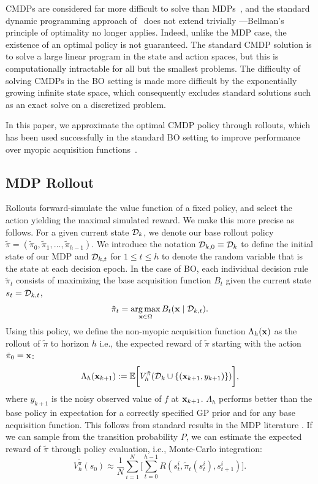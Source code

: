 CMDPs are considered far more difficult to solve than MDPs~\citep{altman1999constrained}, and the standard dynamic programming approach of~\citet{bertsekas1995dynamic} does not extend trivially ---Bellman's principle of optimality no longer applies.
Indeed, unlike the MDP case, the existence of an optimal policy is not guaranteed.
The standard CMDP solution is to solve a large linear program in the state and action spaces, but this is computationally intractable for all but the smallest problems.
The difficulty of solving CMDPs in the BO setting is made more difficult by the exponentially growing infinite state space, which consequently excludes standard solutions such as an exact solve on a discretized problem.

In this paper, we approximate the optimal CMDP policy through rollouts, which has been used successfully in the standard BO setting to improve performance over myopic acquisition functions~\citep{lam2016bayesian}.

\subsection{MDP Rollout}
Rollouts forward-simulate the value function of a fixed policy, and select the action yielding the maximal simulated reward.
We make this more precise as follows.
For a given current state ${\mathcal{D}}_k$, we denote our base rollout policy $\tilde \pi = (\tilde \pi_0, \tilde \pi_1, \ldots ,\tilde \pi_{h-1})$.
We introduce the notation ${\mathcal{D}}_{k,0}\equiv{\mathcal{D}}_k$ to define the initial state of our MDP and ${\mathcal{D}}_{k,t}$ for $1\leq t\leq h$ to denote the random variable that is the state at each decision epoch.
In the case of BO, each individual decision rule $\tilde{\pi}_t$ consists of maximizing the base acquisition function $B_t$ given the current state $s_t={\mathcal{D}}_{k,t}$,
\[
    \tilde \pi_t = \operatorname*{arg\,max}_{{\mathbf{x}} \in \Omega} B_t({\mathbf{x}} \mid {\mathcal{D}}_{k,t}).
\]
Using this policy, we define the non-myopic acquisition function $\Lambda_h({\mathbf{x}})$ as the rollout of $\tilde \pi$ to horizon $h$ i.e., the expected reward of $\tilde{\pi}$ starting with the action $\tilde{\pi}_0={\mathbf{x}}$:
\[
    \Lambda_{h}({\mathbf{x}}_{k+1}) := {\mathbb E} \bigg[ V^{\tilde \pi}_h ({\mathcal{D}}_k \cup \{({\mathbf{x}}_{k+1}, y_{k+1})\}) \bigg] ,
\]
where $y_{k+1}$ is the noisy observed value of $f$ at ${\mathbf{x}}_{k+1}$.
$\Lambda_h$ performs better than the base policy in expectation for a correctly specified GP prior and for any base acquisition function.
This follows from standard results in the MDP literature \citep{bertsekas1995dynamic}.
If we can sample from the transition probability $P$, we can estimate the expected reward of $\tilde \pi$ through policy evaluation, i.e., Monte-Carlo integration:
\[
    V^{\tilde \pi}_h(s_0) \approx \frac{1}{N} \sum_{i=1}^N \bigg[\sum_{t=0}^{h-1} R(s^i_t, \tilde \pi_t(s^i_t), s^i_{t+1}) \bigg].
\]

